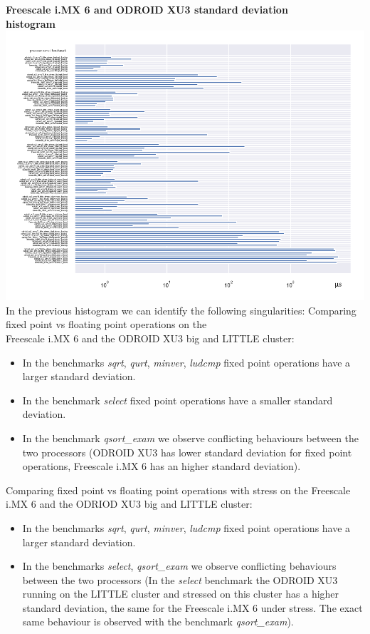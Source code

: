 \clearpage
\textbf{Freescale i.MX 6 and ODROID XU3 standard deviation\\ histogram}\newline
\hspace*{-3.2cm}
\includegraphics[width=570pt]{boards_stddev_histogram.pdf}\\[4cm]
In the previous histogram we can identify the following singularities:
Comparing fixed point vs floating point operations on the \\ Freescale i.MX 6 and the ODROID XU3 big and LITTLE cluster:
\begin{itemize}
		\item In the benchmarks \textit{sqrt}, \textit{qurt}, \textit{minver}, \textit{ludcmp} fixed point operations have a larger standard deviation.
		\item In the benchmark \textit{select} fixed point operations have a smaller standard deviation.
		\item In the benchmark \textit{qsort\_exam} we observe conflicting behaviours between the two processors (ODROID XU3 has lower standard deviation for fixed point operations, Freescale i.MX 6 has an higher standard deviation).
\end{itemize}
Comparing fixed point vs floating point operations with stress on the Freescale i.MX 6 and the ODRIOD XU3 big and LITTLE cluster:
\begin{itemize}
		\item In the benchmarks \textit{sqrt}, \textit{qurt}, \textit{minver}, \textit{ludcmp} fixed point operations have a larger standard deviation.
		\item In the benchmarks \textit{select}, \textit{qsort\_exam} we observe conflicting behaviours between the two processors (In the \textit{select} benchmark the ODROID XU3 running on the LITTLE cluster and stressed on this cluster has a higher standard deviation, the same for the Freescale i.MX 6 under stress. The exact same behaviour is observed with the benchmark \textit{qsort\_exam}).
\end{itemize}

